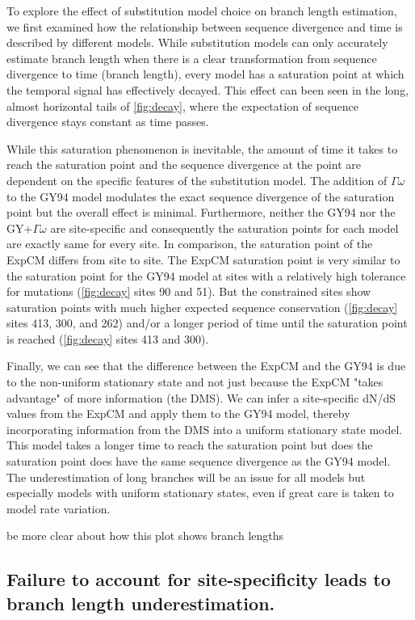 \documentclass[11pt]{article}
\newcommand\skhcomment[1]{{\color{cyan}#1}}
\begin{document}
To explore the effect of substitution model choice on branch length estimation, we first examined how the relationship between sequence divergence and time is described by different models. 
While substitution models can only accurately estimate branch length when there is a clear transformation from sequence divergence to time (branch length), every model has a saturation point at which the temporal signal has effectively decayed. 
This effect can been seen in the long, almost horizontal tails of \ref{fig:decay}, where the expectation of sequence divergence stays constant as time passes. 

While this saturation phenomenon is inevitable, the amount of time it takes to reach the saturation point and the sequence divergence at the point are dependent on the specific features of the substitution model. 
The addition of $\Gamma\omega$ to the GY94 model modulates the exact sequence divergence of the saturation point but the overall effect is minimal. 
Furthermore, neither the GY94 nor the GY+$\Gamma\omega$ are site-specific and consequently the saturation points for each model are exactly same for every site. 
In comparison, the saturation point of the ExpCM differs from site to site. 
The ExpCM saturation point is very similar to the saturation point for the GY94 model at sites with a relatively high tolerance for mutations (\ref{fig:decay} sites 90 and 51). 
But the constrained sites show saturation points with much higher expected sequence conservation (\ref{fig:decay} sites 413, 300, and 262) and/or a longer period of time until the saturation point is reached (\ref{fig:decay} sites 413 and 300). 

Finally, we can see that the difference between the ExpCM and the GY94 is due to the non-uniform stationary state and not just because the ExpCM "takes advantage" of more information (the DMS). 
We can infer a site-specific dN/dS values from the ExpCM \cite{spielman2015relationship} and apply them to the GY94 model, thereby incorporating information from the DMS into a uniform stationary state model. 
This model takes a longer time to reach the saturation point but does the saturation point does have the same sequence divergence as the GY94 model. 
The underestimation of long branches will be an issue for all models but especially models with uniform stationary states, even if great care is taken to model rate variation. 

\skhcomment{be more clear about how this plot shows branch lengths }


\subsection*{Failure to account for site-specificity leads to branch length underestimation.}
\end{document}
